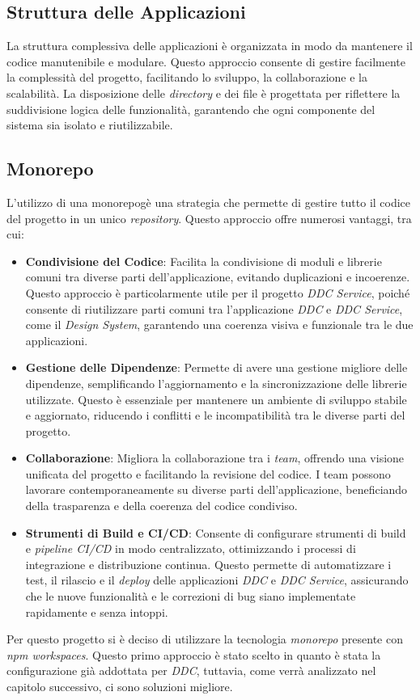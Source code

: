 \subsection{Struttura delle Applicazioni}
\label{subsec:struttura_applicazioni}

La struttura complessiva delle applicazioni è organizzata in modo da mantenere il codice manutenibile e modulare.
Questo approccio consente di gestire facilmente la complessità del progetto, facilitando lo sviluppo, la collaborazione e la scalabilità. 
La disposizione delle \textit{directory} e dei file è progettata per riflettere la suddivisione logica delle funzionalità, garantendo che ogni componente del sistema sia isolato e riutilizzabile.


\subsection{Monorepo}
L'utilizzo di una \gls{monorepog}\glox è una strategia che permette di gestire tutto il codice del progetto in un unico \textit{repository}.
Questo approccio offre numerosi vantaggi, tra cui:

\begin{itemize}
    \item \textbf{Condivisione del Codice}: Facilita la condivisione di moduli e librerie comuni tra diverse parti dell'applicazione, evitando duplicazioni e incoerenze.
    Questo approccio è particolarmente utile per il progetto \textit{DDC Service}, poiché consente di riutilizzare parti comuni tra l'applicazione \textit{DDC} e \textit{DDC Service}, come il \textit{Design System}, garantendo una coerenza visiva e funzionale tra le due applicazioni.
    \item \textbf{Gestione delle Dipendenze}: Permette di avere una gestione migliore delle dipendenze, semplificando l'aggiornamento e la sincronizzazione delle librerie utilizzate.
    Questo è essenziale per mantenere un ambiente di sviluppo stabile e aggiornato, riducendo i conflitti e le incompatibilità tra le diverse parti del progetto.
    \item \textbf{Collaborazione}: Migliora la collaborazione tra i \textit{team}, offrendo una visione unificata del progetto e facilitando la revisione del codice.
    I team possono lavorare contemporaneamente su diverse parti dell'applicazione, beneficiando della trasparenza e della coerenza del codice condiviso.
    \item \textbf{Strumenti di Build e CI/CD}: Consente di configurare strumenti di build e \textit{pipeline CI/CD} in modo centralizzato, ottimizzando i processi di integrazione e distribuzione continua.
    Questo permette di automatizzare i test, il rilascio e il \textit{deploy} delle applicazioni \textit{DDC} e \textit{DDC Service}, assicurando che le nuove funzionalità e le correzioni di bug siano implementate rapidamente e senza intoppi.
\end{itemize}
Per questo progetto si è deciso di utilizzare la tecnologia \textit{monorepo} presente con \textit{npm workspaces}.
Questo primo approccio è stato scelto in quanto è stata la configurazione già addottata per \textit{DDC}, tuttavia, come verrà analizzato nel capitolo successivo, ci sono soluzioni migliore.

